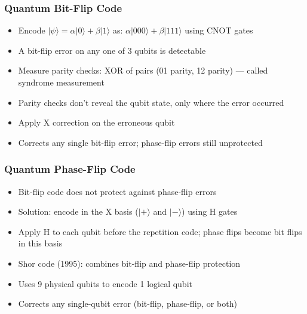 \begin{frame}[fragile]\frametitle{Quantum Bit-Flip Code}
\begin{itemize}
\item Encode $|\psi\rangle = \alpha|0\rangle + \beta|1\rangle$ as:
  $\alpha|000\rangle + \beta|111\rangle$ using CNOT gates
\item A bit-flip error on any one of 3 qubits is detectable
\item Measure parity checks: XOR of pairs (01 parity, 12 parity) --- called syndrome measurement
\item Parity checks don't reveal the qubit state, only where the error occurred
\item Apply X correction on the erroneous qubit
\item Corrects any single bit-flip error; phase-flip errors still unprotected
\end{itemize}
\end{frame}

\begin{frame}[fragile]\frametitle{Quantum Phase-Flip Code}
\begin{itemize}
\item Bit-flip code does not protect against phase-flip errors
\item Solution: encode in the X basis ($|+\rangle$ and $|-\rangle$) using H gates
\item Apply H to each qubit before the repetition code; phase flips become bit flips in this basis
\item Shor code (1995): combines bit-flip and phase-flip protection
\item Uses 9 physical qubits to encode 1 logical qubit
\item Corrects any single-qubit error (bit-flip, phase-flip, or both)
\end{itemize}
\end{frame}


